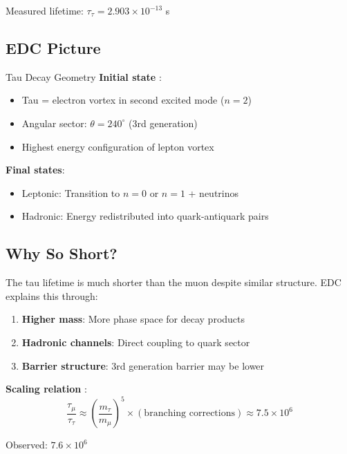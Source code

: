 Measured lifetime: $\tau_\tau = 2.903 \times 10^{-13}$ s \tagBL

\subsection{EDC Picture}

\begin{mechanism}{Tau Decay Geometry}
\textbf{Initial state} \tagP{}:
\begin{itemize}[nosep]
\item Tau = electron vortex in second excited mode ($n = 2$)
\item Angular sector: $\theta = 240^\circ$ (3rd generation)
\item Highest energy configuration of lepton vortex
\end{itemize}

\textbf{Final states}:
\begin{itemize}[nosep]
\item Leptonic: Transition to $n = 0$ or $n = 1$ + neutrinos
\item Hadronic: Energy redistributed into quark-antiquark pairs
\end{itemize}
\end{mechanism}

\subsection{Why So Short?}

The tau lifetime is much shorter than the muon despite similar
structure. EDC explains this through:

\begin{enumerate}[nosep]
\item \textbf{Higher mass}: More phase space for decay products
\item \textbf{Hadronic channels}: Direct coupling to quark sector
\item \textbf{Barrier structure}: 3rd generation barrier may be lower
\end{enumerate}

\textbf{Scaling relation} \tagI{}:
\begin{equation}
\frac{\tau_\mu}{\tau_\tau} \approx \left(\frac{m_\tau}{m_\mu}\right)^5
\times (\text{branching corrections}) \approx 7.5 \times 10^6
\end{equation}

Observed: $7.6 \times 10^6$ \checkmark

